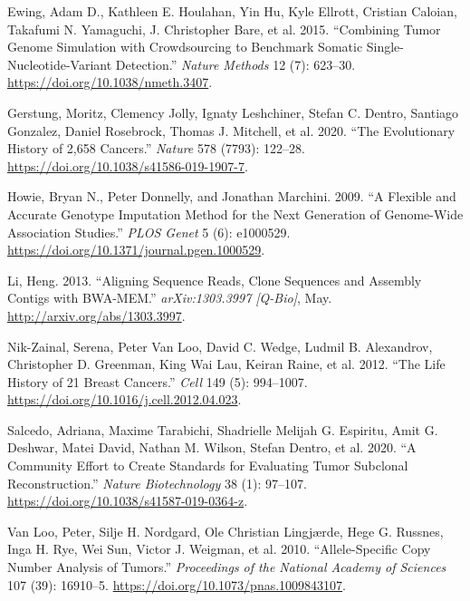 \documentclass[]{article}
\begin{document}
\leavevmode\hypertarget{ref-ewing_combining_2015}{}%
Ewing, Adam D., Kathleen E. Houlahan, Yin Hu, Kyle Ellrott, Cristian
Caloian, Takafumi N. Yamaguchi, J. Christopher Bare, et al. 2015.
``Combining Tumor Genome Simulation with Crowdsourcing to Benchmark
Somatic Single-Nucleotide-Variant Detection.'' \emph{Nature Methods} 12
(7): 623--30. \url{https://doi.org/10.1038/nmeth.3407}.

\leavevmode\hypertarget{ref-gerstung_evolutionary_2020}{}%
Gerstung, Moritz, Clemency Jolly, Ignaty Leshchiner, Stefan C. Dentro,
Santiago Gonzalez, Daniel Rosebrock, Thomas J. Mitchell, et al. 2020.
``The Evolutionary History of 2,658 Cancers.'' \emph{Nature} 578 (7793):
122--28. \url{https://doi.org/10.1038/s41586-019-1907-7}.

\leavevmode\hypertarget{ref-howie_flexible_2009}{}%
Howie, Bryan N., Peter Donnelly, and Jonathan Marchini. 2009. ``A
Flexible and Accurate Genotype Imputation Method for the Next Generation
of Genome-Wide Association Studies.'' \emph{PLOS Genet} 5 (6): e1000529.
\url{https://doi.org/10.1371/journal.pgen.1000529}.

\leavevmode\hypertarget{ref-li_aligning_2013}{}%
Li, Heng. 2013. ``Aligning Sequence Reads, Clone Sequences and Assembly
Contigs with BWA-MEM.'' \emph{arXiv:1303.3997 {[}Q-Bio{]}}, May.
\url{http://arxiv.org/abs/1303.3997}.

\leavevmode\hypertarget{ref-nik-zainal_life_2012}{}%
Nik-Zainal, Serena, Peter Van Loo, David C. Wedge, Ludmil B. Alexandrov,
Christopher D. Greenman, King Wai Lau, Keiran Raine, et al. 2012. ``The
Life History of 21 Breast Cancers.'' \emph{Cell} 149 (5): 994--1007.
\url{https://doi.org/10.1016/j.cell.2012.04.023}.

\leavevmode\hypertarget{ref-salcedo_community_2020}{}%
Salcedo, Adriana, Maxime Tarabichi, Shadrielle Melijah G. Espiritu, Amit
G. Deshwar, Matei David, Nathan M. Wilson, Stefan Dentro, et al. 2020.
``A Community Effort to Create Standards for Evaluating Tumor Subclonal
Reconstruction.'' \emph{Nature Biotechnology} 38 (1): 97--107.
\url{https://doi.org/10.1038/s41587-019-0364-z}.

\leavevmode\hypertarget{ref-van_loo_allele-specific_2010}{}%
Van Loo, Peter, Silje H. Nordgard, Ole Christian Lingjærde, Hege G.
Russnes, Inga H. Rye, Wei Sun, Victor J. Weigman, et al. 2010.
``Allele-Specific Copy Number Analysis of Tumors.'' \emph{Proceedings of
the National Academy of Sciences} 107 (39): 16910--5.
\url{https://doi.org/10.1073/pnas.1009843107}.
\end{document}
